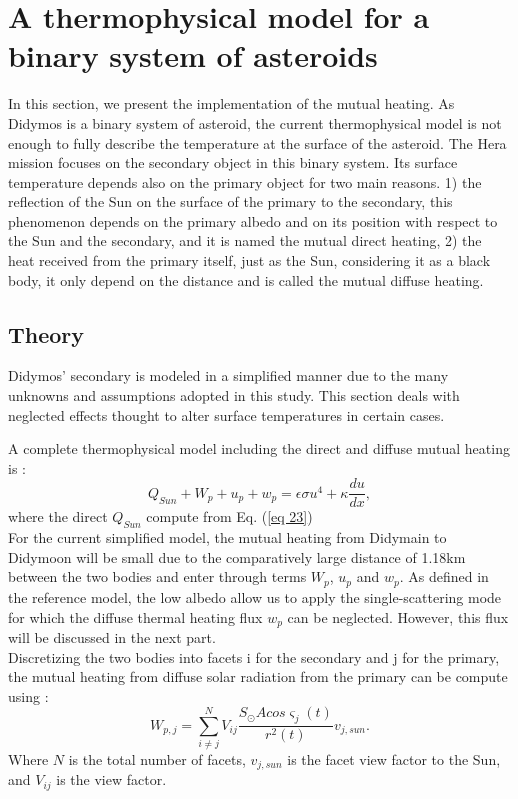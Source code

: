 \section{A thermophysical model for a binary system of asteroids}
\label{mutual}

In this section, we present the implementation of the mutual heating. As Didymos is a binary system of asteroid, the current thermophysical model is not enough to fully describe the temperature at the surface of the asteroid. The Hera mission focuses on the secondary object in this binary system. Its surface temperature depends also on the primary object for two main reasons. 1) the reflection of the Sun on the surface of the primary to the secondary, this phenomenon depends on the primary albedo and on its position with respect to the Sun and the secondary, and it is named the mutual direct heating, 2) the heat received from the primary itself, just as the Sun, considering it as a black body, it only depend on the distance and is called the mutual diffuse heating.

\subsection{Theory}

Didymos’ secondary is modeled in a simplified manner due to the many unknowns and assumptions adopted in this study. This section deals with neglected effects thought to alter surface temperatures in certain cases.

A complete thermophysical model including the direct and diffuse mutual heating is \cite{pelivan}:
\begin{equation}
    Q_{Sun} + W_p + u_p + w_p = \epsilon \sigma u^4 + \kappa \frac{du}{dx},
    \label{eq 41}
\end{equation}
where the direct $Q_{Sun}$ compute from Eq. (\ref{eq 23})\\

For the current simplified model, the mutual heating from Didymain to Didymoon will be small due to the comparatively large distance of 1.18km \cite{Model} between the two bodies and enter through terms $W_p$, $u_p$ and $w_p$. As defined in the reference model, the low albedo allow us to apply the single-scattering mode for which the diffuse thermal heating flux $w_p$ can be neglected. However, this flux will be discussed in the next part.\\

Discretizing the two bodies into facets i for the secondary and j for the primary, the mutual heating from diffuse solar radiation from the primary can be compute using :
\begin{equation}
    W_{p,j} = \sum_{i \neq j}^N V_{ij} \frac{S_{\odot} A cos \varsigma _j (t)}{r^2 (t)} v_{j,sun}.
    \label{eq 42}
\end{equation}
Where $N$ is the total number of facets, $v_{j,sun}$ is the facet view factor to the Sun, and $V_{ij}$ is the view factor.\\

